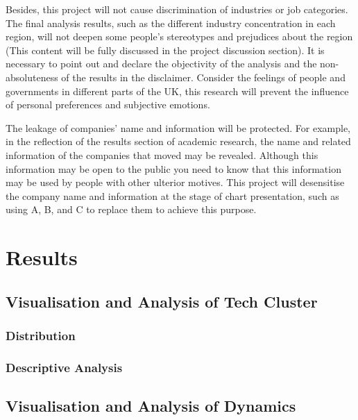 \documentclass[
  12pt,
  oneside]{book}
\begin{document}
Besides, this project will not cause discrimination of industries or job categories. The final analysis results, such as the different industry concentration in each region, will not deepen some people's stereotypes and prejudices about the region (This content will be fully discussed in the project discussion section). It is necessary to point out and declare the objectivity of the analysis and the non-absoluteness of the results in the disclaimer. Consider the feelings of people and governments in different parts of the UK, this research will prevent the influence of personal preferences and subjective emotions.

The leakage of companies' name and information will be protected. For example, in the reflection of the results section of academic research, the name and related information of the companies that moved may be revealed. Although this information may be open to the public you need to know that this information may be used by people with other ulterior motives. This project will desensitise the company name and information at the stage of chart presentation, such as using A, B, and C to replace them to achieve this purpose.

\hypertarget{results}{%
\chapter{Results}\label{results}}

\hypertarget{visualisation-and-analysis-of-tech-cluster}{%
\section{Visualisation and Analysis of Tech Cluster}\label{visualisation-and-analysis-of-tech-cluster}}

\hypertarget{distribution}{%
\subsection{Distribution}\label{distribution}}

\hypertarget{descriptive-analysis}{%
\subsection{Descriptive Analysis}\label{descriptive-analysis}}

\hypertarget{visualisation-and-analysis-of-dynamics}{%
\section{Visualisation and Analysis of Dynamics}\label{visualisation-and-analysis-of-dynamics}}
\end{document}
